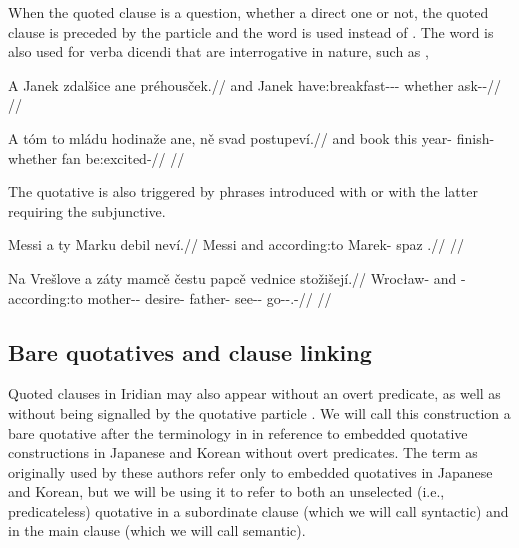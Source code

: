 When the quoted clause is a question, whether a direct one or not, the quoted
clause is preceded by the particle  and the word
 is used instead of . The word  is also
used for verba dicendi that are interrogative in nature, such as
,

\pex
\begingl
  \gla A Janek zdalšice ane préhousček.//
  \glb and Janek have:breakfast-\Av{}-\Pf{}-\Quot{} whether ask-\Av{}-\Pf{}//
  \glft {}//
\endgl
\xe

\pex
\begingl
  \gla A tóm to mládu hodinaže ane, ně svad postupeví.//
  \glb and book this year-\Ins{} finish- whether \Pl{} fan be:excited-//
  \glft {}//
\endgl
\xe

The quotative is also triggered by phrases introduced with  or  with the latter requiring the subjunctive. 

\pex
\begingl
  \gla Messi a ty Marku debil neví.//
  \glb Messi and according:to Marek-\Ins{} spaz \Cop{}.\Sbj{}//
  \glft {}//
\endgl
\xe

\pex
\begingl
  \gla Na Vrešlove a záty mamcě čestu papcě vednice stožišejí.//
  \glb \Loc{} Wrocław-\Acc{} and \Neg{}-according:to mother-\Dim{}-\Gen{} desire-\Ins{} father-\Gen{} see-\Pv{}-\SupP{} go-\Av{}-\Subj{}.\Pf{}-\Quot{}//
  \glft {}//
\endgl
\xe


\subsection{Bare quotatives and clause linking}

Quoted clauses in Iridian may also appear without an overt predicate, as well as
without being signalled by the quotative particle . We will call this
construction a {\sc bare quotative} after the terminology in
\textcite{tomioka2019} in reference to embedded quotative constructions in
Japanese and Korean without overt predicates. The term as originally used by
these authors refer only to embedded quotatives in Japanese and Korean, but we
will be using it to refer to both an unselected (i.e., predicateless) quotative
in a subordinate clause (which we will call {\sc syntactic}) and in the main
clause (which we will call {\sc semantic}).

